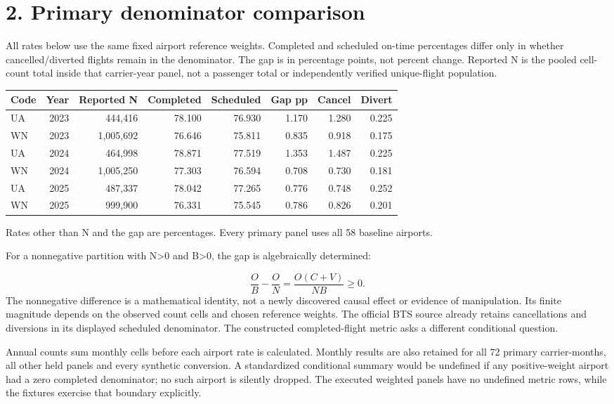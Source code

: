 \documentclass[11pt]{article}
\begin{document}
\newpage\section*{2. Primary denominator comparison}
All rates below use the same fixed airport reference weights. Completed and scheduled on-time percentages differ only in whether cancelled/diverted flights remain in the denominator. The gap is in percentage points, not percent change. Reported N is the pooled cell-count total inside that carrier-year panel, not a passenger total or independently verified unique-flight population.

\begin{center}\small\setlength{\tabcolsep}{4pt}
\begin{tabular}{lrrrrrrr}\toprule
Code & Year & Reported N & Completed & Scheduled & Gap pp & Cancel & Divert \\
\midrule
UA & 2023 & 444,416 & 78.100 & 76.930 & 1.170 & 1.280 & 0.225 \\
WN & 2023 & 1,005,692 & 76.646 & 75.811 & 0.835 & 0.918 & 0.175 \\
UA & 2024 & 464,998 & 78.871 & 77.519 & 1.353 & 1.487 & 0.225 \\
WN & 2024 & 1,005,250 & 77.303 & 76.594 & 0.708 & 0.730 & 0.181 \\
UA & 2025 & 487,337 & 78.042 & 77.265 & 0.776 & 0.748 & 0.252 \\
WN & 2025 & 999,900 & 76.331 & 75.545 & 0.786 & 0.826 & 0.201 \\
\bottomrule\end{tabular}\end{center}
\small Rates other than N and the gap are percentages. Every primary panel uses all 58 baseline airports.\normalsize\par

For a nonnegative partition with N>0 and B>0, the gap is algebraically determined:

\[\frac{O}{B}-\frac{O}{N}=\frac{O(C+V)}{NB}\geq0.\]
The nonnegative difference is a mathematical identity, not a newly discovered causal effect or evidence of manipulation. Its finite magnitude depends on the observed count cells and chosen reference weights. The official BTS source already retains cancellations and diversions in its displayed scheduled denominator. The constructed completed-flight metric asks a different conditional question.

Annual counts sum monthly cells before each airport rate is calculated. Monthly results are also retained for all 72 primary carrier-months, all other held panels and every synthetic conversion. A standardized conditional summary would be undefined if any positive-weight airport had a zero completed denominator; no such airport is silently dropped. The executed weighted panels have no undefined metric rows, while the fixtures exercise that boundary explicitly.
\end{document}

